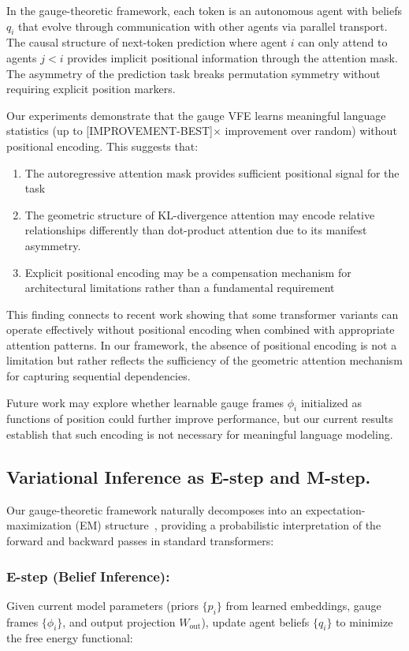 \documentclass[twoside,11pt]{article}
\begin{document}
In the gauge-theoretic framework, each token is an autonomous agent with beliefs $q_i$ that evolve through communication with other agents via parallel transport. The causal structure of next-token prediction where agent $i$ can only attend to agents $j < i$ provides implicit positional information through the attention mask. The asymmetry of the prediction task breaks permutation symmetry without requiring explicit position markers.

Our experiments demonstrate that the gauge VFE learns meaningful language statistics (up to [IMPROVEMENT-BEST]$\times$ improvement over random) without positional encoding. This suggests that:
\begin{enumerate}
    \item The autoregressive attention mask provides sufficient positional signal for the task
    \item The geometric structure of KL-divergence attention may encode relative relationships differently than dot-product attention due to its manifest asymmetry.
    \item Explicit positional encoding may be a compensation mechanism for architectural limitations rather than a fundamental requirement
\end{enumerate}

This finding connects to recent work showing that some transformer variants can operate effectively without positional encoding when combined with appropriate attention patterns. In our framework, the absence of positional encoding is not a limitation but rather reflects the sufficiency of the geometric attention mechanism for capturing sequential dependencies.

Future work may explore whether learnable gauge frames $\phi_i$ initialized as functions of position could further improve performance, but our current results establish that such encoding is not necessary for meaningful language modeling.

\subsection{Variational Inference as E-step and M-step.}

Our gauge-theoretic framework naturally decomposes into an expectation-maximization (EM) structure~\citep{dempster1977maximum}, providing a probabilistic interpretation of the forward and backward passes in standard transformers:

\subsubsection{E-step (Belief Inference):} Given current model parameters (priors $\{p_i\}$ from learned embeddings, gauge frames $\{\phi_i\}$, and output projection $W_{\text{out}}$), update agent beliefs $\{q_i\}$ to minimize the free energy functional:
\end{document}

